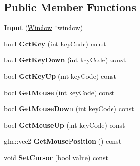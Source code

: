 \subsection*{Public Member Functions}
\begin{DoxyCompactItemize}
\item 
\hypertarget{class_z_e_g_l_1_1_input_a4f44bbd5cf0bea669dd96465cea32fd9}{}{\bfseries Input} (\hyperlink{class_z_e_g_l_1_1_window}{Window} $\ast$window)\label{class_z_e_g_l_1_1_input_a4f44bbd5cf0bea669dd96465cea32fd9}

\item 
\hypertarget{class_z_e_g_l_1_1_input_affd874e9c16432a23ea64425115769dc}{}bool {\bfseries Get\+Key} (int key\+Code) const \label{class_z_e_g_l_1_1_input_affd874e9c16432a23ea64425115769dc}

\item 
\hypertarget{class_z_e_g_l_1_1_input_ac7ee5951065bfaded130ec23a6e82454}{}bool {\bfseries Get\+Key\+Down} (int key\+Code) const \label{class_z_e_g_l_1_1_input_ac7ee5951065bfaded130ec23a6e82454}

\item 
\hypertarget{class_z_e_g_l_1_1_input_a0a611c8f1348b37b2e308dba215dc46b}{}bool {\bfseries Get\+Key\+Up} (int key\+Code) const \label{class_z_e_g_l_1_1_input_a0a611c8f1348b37b2e308dba215dc46b}

\item 
\hypertarget{class_z_e_g_l_1_1_input_a22d71f43dbbce4659573a4b63a4b861b}{}bool {\bfseries Get\+Mouse} (int key\+Code) const \label{class_z_e_g_l_1_1_input_a22d71f43dbbce4659573a4b63a4b861b}

\item 
\hypertarget{class_z_e_g_l_1_1_input_acaf57240c28e6da0e76af73c9266088d}{}bool {\bfseries Get\+Mouse\+Down} (int key\+Code) const \label{class_z_e_g_l_1_1_input_acaf57240c28e6da0e76af73c9266088d}

\item 
\hypertarget{class_z_e_g_l_1_1_input_a9801be25170679fd386986f03de40d21}{}bool {\bfseries Get\+Mouse\+Up} (int key\+Code) const \label{class_z_e_g_l_1_1_input_a9801be25170679fd386986f03de40d21}

\item 
\hypertarget{class_z_e_g_l_1_1_input_a9328de8560bc8a9116ada92c63f87346}{}glm\+::vec2 {\bfseries Get\+Mouse\+Position} () const \label{class_z_e_g_l_1_1_input_a9328de8560bc8a9116ada92c63f87346}

\item 
\hypertarget{class_z_e_g_l_1_1_input_aafef2f13da2c62be8bb7c647a5e4ffee}{}void {\bfseries Set\+Cursor} (bool value) const \label{class_z_e_g_l_1_1_input_aafef2f13da2c62be8bb7c647a5e4ffee}


\end{DoxyCompactItemize}
